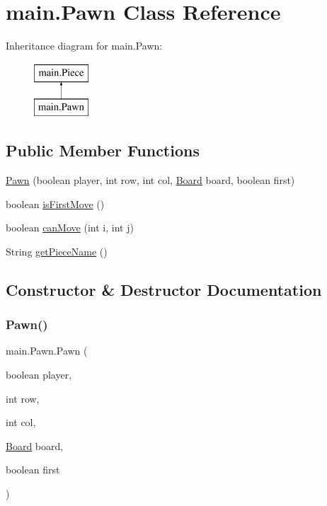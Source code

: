\hypertarget{classmain_1_1_pawn}{}\section{main.\+Pawn Class Reference}
\label{classmain_1_1_pawn}
Inheritance diagram for main.\+Pawn\+:\begin{figure}[H]
\begin{center}
\leavevmode
\includegraphics[height=2.000000cm]{classmain_1_1_pawn}
\end{center}
\end{figure}
\subsection*{Public Member Functions}
\begin{DoxyCompactItemize}
\item 
\mbox{\hyperlink{classmain_1_1_pawn_a8da9bc260d94a80289bd2b6dc8de657e}{Pawn}} (boolean player, int row, int col, \mbox{\hyperlink{classmain_1_1_board}{Board}} board, boolean first)
\item 
boolean \mbox{\hyperlink{classmain_1_1_pawn_ab9f754416283c01c007d60d03fce359a}{is\+First\+Move}} ()
\item 
boolean \mbox{\hyperlink{classmain_1_1_pawn_a25b0e4665511cc671516a94744bf0798}{can\+Move}} (int i, int j)
\item 
String \mbox{\hyperlink{classmain_1_1_pawn_a9b2b0585c4109472bff44ee71709ba2d}{get\+Piece\+Name}} ()
\end{DoxyCompactItemize}


\subsection{Constructor \& Destructor Documentation}
\mbox{\label{classmain_1_1_pawn_a8da9bc260d94a80289bd2b6dc8de657e}} 
\subsubsection{\texorpdfstring{Pawn()}{Pawn()}}
{\footnotesize\ttfamily main.\+Pawn.\+Pawn (\begin{DoxyParamCaption}\item[{boolean}]{player,  }\item[{int}]{row,  }\item[{int}]{col,  }\item[{\mbox{\hyperlink{classmain_1_1_board}{Board}}}]{board,  }\item[{boolean}]{first }\end{DoxyParamCaption})\hspace{0.3cm}{\ttfamily [inline]}}

